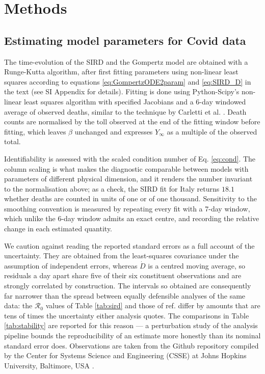 \documentclass{article}
\begin{document}
\section*{Methods}

\subsection*{Estimating model parameters for Covid data}
The time-evolution of the SIRD and the Gompertz model are obtained with a Runge-Kutta algorithm, after first fitting parameters using non-linear least squares according to equations \ref{eq:GompertzODE2param} and \ref{eq:SIRD_D} in the text (see SI Appendix for details). 
Fitting is done using Python-Scipy's non-linear least squares algorithm with specified Jacobians and a 6-day windowed average of observed deaths, similar to the technique by Carletti et al. \cite{carletti2020covid}. 
Death counts are normalised by the toll observed at the end of the fitting window before
fitting, which leaves $\beta$ unchanged and expresses $Y_{\infty}$ as a multiple of the
observed total.

Identifiability is assessed with the scaled condition number of Eq. \ref{eq:cond}. The
column scaling is what makes the diagnostic comparable between models with parameters of
different physical dimension, and it renders the number invariant to the normalisation
above; as a check, the SIRD fit for Italy returns $18.1$ whether deaths are counted in
units of one or of one thousand. Sensitivity to the smoothing convention is measured by
repeating every fit with a 7-day window, which unlike the 6-day window admits an exact
centre, and recording the relative change in each estimated quantity.

We caution against reading the reported standard errors as a full account of the
uncertainty. They are obtained from the least-squares covariance under the assumption of
independent errors, whereas $\dot{D}$ is a centred moving average, so residuals a day
apart share five of their six constituent observations and are strongly correlated by
construction. The intervals so obtained are consequently far narrower than the spread
between equally defensible analyses of the same data: the $\mathcal{R}_0$ values of
Table \ref{tab:sird} and those of ref. \cite{carletti2020covid} differ by amounts that
are tens of times the uncertainty either analysis quotes. The comparisons in
Table \ref{tab:stability} are reported for this reason --- a perturbation study of the
analysis pipeline bounds the reproducibility of an estimate more honestly than its
nominal standard error does.
Observations are taken from the Github repository compiled by the Center for Systems Science and Engineering (CSSE) at Johns Hopkins University, Baltimore, USA \cite{dong2020interactive}. 
\end{document}
